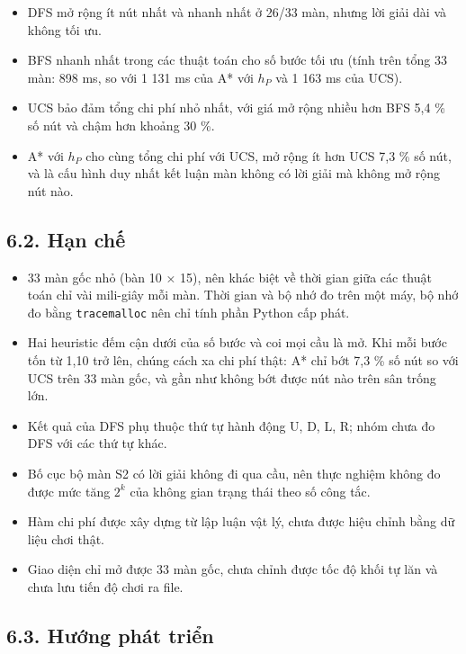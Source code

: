 \begin{itemize}
  \begin{itemize}
  \tightlist
  \item
    DFS mở rộng ít nút nhất và nhanh nhất ở 26/33 màn, nhưng lời giải dài và không tối ưu.
  \item
    BFS nhanh nhất trong các thuật toán cho số bước tối ưu (tính trên tổng 33 màn: 898 ms, so với 1 131 ms của A* với \(h_P\) và 1 163 ms của UCS).
  \item
    UCS bảo đảm tổng chi phí nhỏ nhất, với giá mở rộng nhiều hơn BFS 5,4 \% số nút và chậm hơn khoảng 30 \%.
  \item
    A* với \(h_P\) cho cùng tổng chi phí với UCS, mở rộng ít hơn UCS 7,3 \% số nút, và là cấu hình duy nhất kết luận màn không có lời giải mà không mở rộng nút nào.
  \end{itemize}
\end{itemize}

\subsection{6.2. Hạn chế}

\begin{itemize}
\tightlist
\item
  33 màn gốc nhỏ (bàn 10 × 15), nên khác biệt về thời gian giữa các thuật toán chỉ vài mili-giây mỗi màn. Thời gian và bộ nhớ đo trên một máy, bộ nhớ đo bằng \texttt{tracemalloc} nên chỉ tính phần Python cấp phát.
\item
  Hai heuristic đếm cận dưới của số bước và coi mọi cầu là mở. Khi mỗi bước tốn từ 1,10 trở lên, chúng cách xa chi phí thật: A* chỉ bớt 7,3 \% số nút so với UCS trên 33 màn gốc, và gần như không bớt được nút nào trên sân trống lớn.
\item
  Kết quả của DFS phụ thuộc thứ tự hành động U, D, L, R; nhóm chưa đo DFS với các thứ tự khác.
\item
  Bố cục bộ màn S2 có lời giải không đi qua cầu, nên thực nghiệm không đo được mức tăng \(2^k\) của không gian trạng thái theo số công tắc.
\item
  Hàm chi phí được xây dựng từ lập luận vật lý, chưa được hiệu chỉnh bằng dữ liệu chơi thật.
\item
  Giao diện chỉ mở được 33 màn gốc, chưa chỉnh được tốc độ khối tự lăn và chưa lưu tiến độ chơi ra file.
\end{itemize}

\subsection{6.3. Hướng phát triển}

